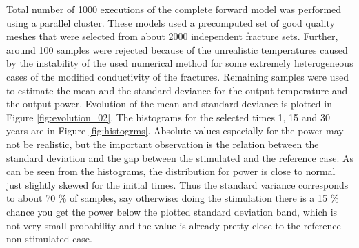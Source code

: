 \documentclass{article}
\begin{document}
Total number of 1000 executions of the complete forward model was performed using a parallel cluster. These models used a precomputed set of good quality meshes that were selected from about 2000 independent fracture sets. Further, around 100 samples were rejected because of the unrealistic temperatures caused by the instability of the used numerical method for some extremely heterogeneous cases of the modified conductivity of the fractures. Remaining samples were used to estimate the mean and the standard deviance for the output temperature and the output power. Evolution of the mean and standard deviance is plotted in Figure \ref{fig:evolution_02}. 
The histograms for the selected times 1, 15 and 30 years are in Figure \ref{fig:histogrms}. Absolute values especially for the power may not be realistic, but the important observation is the relation between the standard deviation and the gap between the stimulated and the reference case. As can be seen from the histograms, the distribution for power is close to normal just slightly skewed for the initial times. Thus the standard variance corresponds to about 70 \% of samples, say otherwise: doing the stimulation there is a 15 \% chance you get the power below the plotted standard deviation band, which is not very small probability and the value is already pretty close to the reference non-stimulated case.


\end{document}
